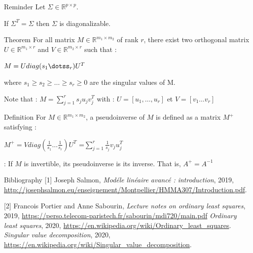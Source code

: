 \documentclass[unknownkeysallowed]{beamer}
\begin{document}
\begin{frame}
\begin{block}{Reminder}
Let $\Sigma\in\mathbb{R}^{p \times p}$.

If $\Sigma^T=\Sigma$ then $\Sigma$ is diagonalizable.
\end{block}
\begin{alertblock}{Theorem}
For all matrix $M\in\mathbb{R}^{m_1 \times m_2}$ of rank $r$, there exist two orthogonal matrix $U\in \mathbb{R}^{m_1 \times r}$ and $V\in\mathbb{R}^{m_2 \times r}$ such that :
\begin{center}
    $M=U diag(s_{1}\dotss_{r})U^T$
\end{center}
where $s_{1}\ge s_{2} \ge \dots \ge s_{r} \ge 0$ are the singular values of M.
\end{alertblock}
\vspace{0.5cm}
Note that : $M=\sum\limits_{j=1}^r s_{j}u_{j}v_{j}^T$ with : $U=[u_{1},\dots,u_{r}]$
et $V=[v_{1} \dots v_{r}]$
\end{frame}


\begin{frame}
\begin{block}{Definition}
For $M\in\mathbb{R}^{m_1 \times m_2}$, a pseudoinverse of $M$ is defined as a matrix $M^{+}$ satisfying :
\begin{center}
    $M^{+}=Vdiag(\frac{1}{s_{1}} \dots \frac{1}{s_{r}})U^T$
    =$\sum\limits_{j=1}^r \frac{1}{s_{j}}v_{j}u_{j}^T$
\end{center}
\end{block}
\vspace{0.5cm}
\rem : If $M$ is invertible, its pseudoinverse is its inverse. That is, $A^{+}=A^{-1}$
\end{frame}

\begin{frame}{Bibliography}
[1] Joseph Salmon, \textit{Modéle linéaire avancé : introduction}, 2019, \url{http://josephsalmon.eu/enseignement/Montpellier/HMMA307/Introduction.pdf}.
\newline

[2] Francois Portier and Anne Sabourin, \textit{Lecture notes on ordinary least squares}, 2019, \url{https://perso.telecom-paristech.fr/sabourin/mdi720/main.pdf}
\newline
\newline
[3] \textit{Ordinary least squares}, 2020,
\url{https://en.wikipedia.org/wiki/Ordinary_least_squares}.
\newline
\newline
[4] \textit{Singular value decomposition}, 2020,
\url{https://en.wikipedia.org/wiki/Singular_value_decomposition}.


\newline
\printbibliography
\end{frame}
\end{document}
